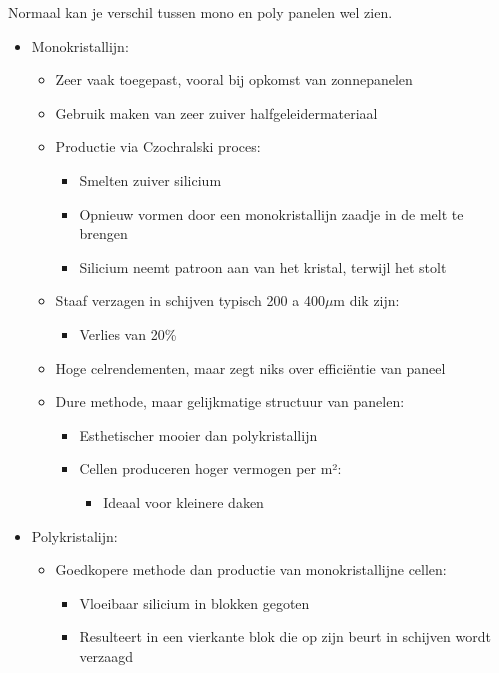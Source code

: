 \documentclass[12pt]{article}
\begin{document}
Normaal kan je verschil tussen mono en poly panelen wel zien.
\begin{itemize}
    \item Monokristallijn:\begin{itemize}
        \item Zeer vaak toegepast, vooral bij opkomst van zonnepanelen
        \item Gebruik maken van zeer zuiver halfgeleidermateriaal
        \item Productie via Czochralski proces:\begin{itemize}
            \item Smelten zuiver silicium 
            \item Opnieuw vormen door een monokristallijn zaadje in de melt te brengen 
            \item Silicium neemt patroon aan van het kristal, terwijl het stolt
        \end{itemize}
        \item Staaf verzagen in schijven typisch 200 a 400$\mu$m dik zijn:\begin{itemize}
            \item Verlies van 20\%
        \end{itemize}
        \item Hoge celrendementen, maar zegt niks over efficiëntie van paneel
        \item Dure methode, maar gelijkmatige structuur van panelen:\begin{itemize}
            \item Esthetischer mooier dan polykristallijn
            \item Cellen produceren hoger vermogen per m²:\begin{itemize}
                \item Ideaal voor kleinere daken                
            \end{itemize}
        \end{itemize}
    \end{itemize}
    \item Polykristalijn:\begin{itemize}
        \item Goedkopere methode dan productie van monokristallijne cellen:\begin{itemize}
            \item Vloeibaar silicium in blokken gegoten
            \item Resulteert in een vierkante blok die op zijn beurt in schijven wordt verzaagd

\end{itemize}
\end{itemize}
\end{itemize}
\end{document}
